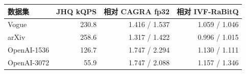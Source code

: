 \begin{tabular}{@{}lrrr@{}}
\toprule
数据集 & JHQ kQPS & 相对 CAGRA fp32 & 相对 IVF-RaBitQ \\
\midrule
Vogue & 230.8 & 1.416 / 1.537 & 1.059 / 1.046 \\
arXiv & 258.6 & 1.317 / 1.422 & 0.996 / 1.015 \\
OpenAI-1536 & 126.7 & 1.747 / 2.294 & 1.130 / 1.111 \\
OpenAI-3072 & 55.9 & 1.747 / 2.088 & 1.157 / 1.346 \\
\bottomrule
\end{tabular}
